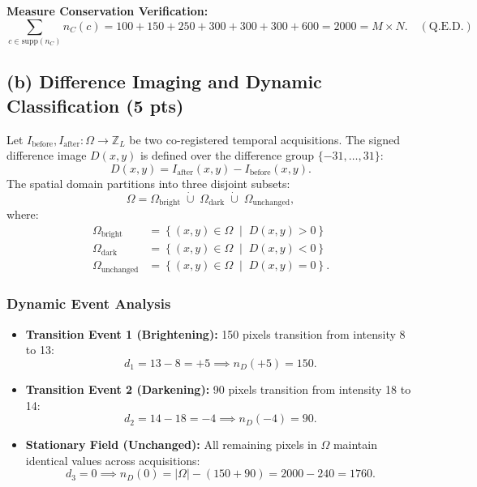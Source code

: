 \documentclass[11pt,a4paper]{article}
\begin{document}
\noindent\textbf{Measure Conservation Verification:}
\begin{equation}
\sum_{c \in \text{supp}(n_C)} n_C(c) = 100 + 150 + 250 + 300 + 300 + 300 + 600 = 2000 = M \times N. \quad (\text{Q.E.D.})
\end{equation}

\subsection{(b) Difference Imaging and Dynamic Classification (5 pts)}
Let $I_{\text{before}}, I_{\text{after}}: \Omega \to \mathbb{Z}_L$ be two co-registered temporal acquisitions. The signed difference image $D(x, y)$ is defined over the difference group $\{-31, \dots, 31\}$:
\begin{equation}
D(x, y) = I_{\text{after}}(x, y) - I_{\text{before}}(x, y).
\end{equation}
The spatial domain partitions into three disjoint subsets:
\begin{equation}
\Omega = \Omega_{\text{bright}} \;\dot{\cup}\; \Omega_{\text{dark}} \;\dot{\cup}\; \Omega_{\text{unchanged}},
\end{equation}
where:
\begin{align}
\Omega_{\text{bright}}    &= \left\{ (x, y) \in \Omega \;\middle|\; D(x, y) > 0 \right\} \\
\Omega_{\text{dark}}      &= \left\{ (x, y) \in \Omega \;\middle|\; D(x, y) < 0 \right\} \\
\Omega_{\text{unchanged}} &= \left\{ (x, y) \in \Omega \;\middle|\; D(x, y) = 0 \right\}.
\end{align}

\subsubsection{Dynamic Event Analysis}
\begin{itemize}
    \item \textbf{Transition Event 1 (Brightening):} 150 pixels transition from intensity 8 to 13:
    \begin{equation}
    d_1 = 13 - 8 = +5 \implies n_D(+5) = 150.
    \end{equation}
    \item \textbf{Transition Event 2 (Darkening):} 90 pixels transition from intensity 18 to 14:
    \begin{equation}
    d_2 = 14 - 18 = -4 \implies n_D(-4) = 90.
    \end{equation}
    \item \textbf{Stationary Field (Unchanged):} All remaining pixels in $\Omega$ maintain identical values across acquisitions:
    \begin{equation}
    d_3 = 0 \implies n_D(0) = |\Omega| - (150 + 90) = 2000 - 240 = 1760.
    \end{equation}
\end{itemize}
\end{document}
